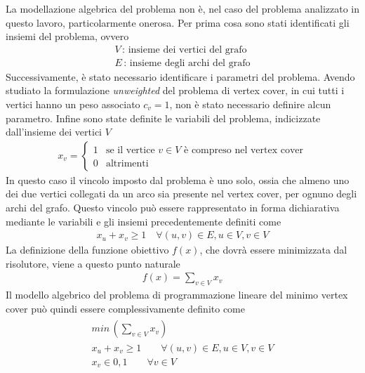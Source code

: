 La modellazione algebrica del problema non è, nel caso del problema analizzato in questo lavoro, particolarmente onerosa. Per prima cosa sono stati identificati gli insiemi del problema, ovvero
\vspace{-0.5cm}
\begin{align*}
V \,  : \, \mbox{insieme dei vertici del grafo}\\
E \, : \, \mbox{insieme degli archi del grafo}
\end{align*}
Successivamente, è stato necessario identificare i parametri del problema. Avendo studiato la formulazione \textit{unweighted} del problema di vertex cover, in cui tutti i vertici hanno un peso associato $c_v=1$, non è stato necessario definire alcun parametro.  Infine sono state definite le variabili del problema, indicizzate dall'insieme dei vertici $V$
\begin{align*}
x_v = \begin{cases}  1 & \mbox{se il vertice } v \in V \mbox{ è compreso nel vertex cover} \\ 0 & \mbox{altrimenti} \end{cases}
\end{align*}
In questo caso il vincolo imposto dal problema è uno solo, ossia che almeno uno dei due vertici collegati da un arco sia presente nel vertex cover, per ognuno degli archi del grafo. Questo vincolo può essere rappresentato in forma dichiarativa mediante le variabili e gli insiemi precedentemente definiti come
\begin{align*}
x_u + x_v \geq 1 \quad \forall (u,v) \in E,  u \in V, v \in V
\end{align*}
La definizione della funzione obiettivo $f(x)$, che dovrà essere minimizzata dal risolutore,  viene a questo punto naturale
\vspace{-0.5cm}
\begin{align*}
f(x) = \sum_{v \in V} x_v
\end{align*}
Il modello algebrico del problema di programmazione lineare del minimo vertex cover può quindi essere complessivamente definito come 
\begin{align}
    \label{eq:mipprob}
	\begin{array}{l}
      min\, (\sum_{v \in V} x_v)\\
      x_u + x_v \geq 1  \qquad \forall (u,v) \in E,  u \in V, v \in V \\
      x_v \in {0,1}  \qquad \forall v \in V 
    \end{array}
\end{align} 

